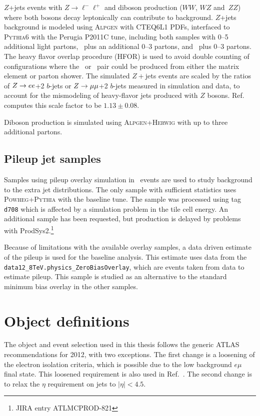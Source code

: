 $Z$+jets events with $Z\rightarrow \ell^-\ell^+$ and diboson production ($WW$, $WZ$ and~$ZZ$) where both bosons decay leptonically can contribute to background. $Z$+jets background is modeled using \textsc{  Alpgen} \cite{Mangano:2002ea} with CTEQ6L1 PDFs, interfaced to \textsc{  Pythia6} with the Perugia P2011C tune, including both samples with 0--5 additional light partons, 
\ccbar\ plus an additional 0--3 partons, and \bbbar\
plus 0--3 partons. The heavy flavor overlap procedure (HFOR) \cite{hfor} is used to avoid double counting of configurations where the \ccbar\ or \bbbar\ pair could be produced from either the matrix element or parton shower. The simulated $Z+$jets  events are scaled by the ratios of $Z\rightarrow ee$+2 $b$-jets or $Z\rightarrow \mu\mu$+2 $b$-jets measured in simulation and data, to account for the mismodeling of heavy-flavor jets produced with $Z$ bosons. Ref.~\cite{xsec} computes this scale factor to be $1.13 \pm 0.08$. 

Diboson production is simulated using \textsc{  Alpgen+Herwig} with up to three additional partons.

\subsection{Pileup jet samples}
Samples using pileup overlay simulation in \ttbar\ events are used to study background to the extra jet distributions. The only sample with sufficient statistics uses \textsc{  Powheg+Pythia} with the baseline tune. The sample was processed using tag \texttt{ d708} which is affected by a simulation problem in the tile cell energy. An additional sample has been requested, but production is delayed by problems with ProdSys2.\footnote{JIRA entry \textsc{  ATLMCPROD-821}} 

Because of limitations with the available overlay samples, a data driven estimate of the pileup is used for the baseline
analysis.  This estimate uses 
data from the \texttt{ data12\_8TeV.physics\_ZeroBiasOverlay}, which are events taken from data to estimate pileup.  This sample is studied as an alternative to the standard minimum bias overlay in the other samples.
\section{Object definitions}
The object and event selection used in this thesis follows the generic ATLAS recommendations for 2012, with two exceptions.  The first change is a loosening of the electron isolation criteria, which is possible due to the low background  $e\mu$ final state. This loosened requirement is also used in Ref.~\cite{xsec}. The second change is to relax the $\eta$ requirement on  jets to $|\eta|<4.5$.

